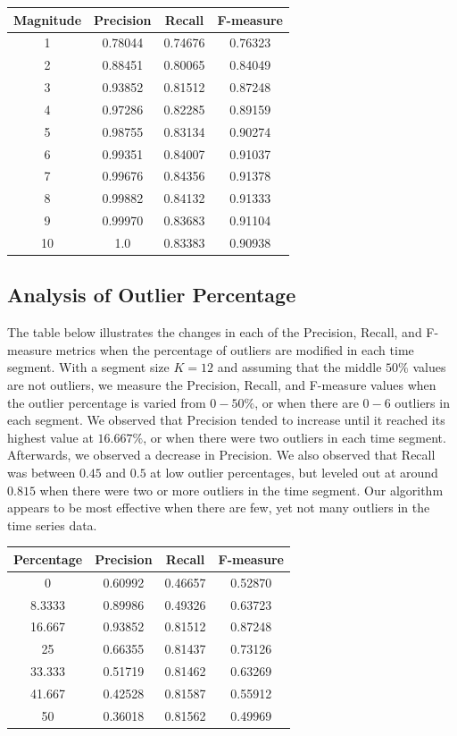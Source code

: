 \documentclass[conference]{IEEEtran}
\begin{document}
\begin{center}
	\begin{tabular}{|c|c|c|c|}
		\hline
		Magnitude & Precision & Recall & F-measure \\
		\hline
		1 & 0.78044 & 0.74676 & 0.76323 \\
		\hline
		2 & 0.88451 & 0.80065 & 0.84049 \\
		\hline
		3 & 0.93852 & 0.81512 & 0.87248 \\
		\hline
		4 & 0.97286 & 0.82285 & 0.89159 \\
		\hline
		5 & 0.98755 & 0.83134 & 0.90274 \\
		\hline
		6 & 0.99351 & 0.84007 & 0.91037 \\
		\hline
		7 & 0.99676 & 0.84356 & 0.91378 \\
		\hline
		8 & 0.99882 & 0.84132 & 0.91333 \\
		\hline
		9 & 0.99970 & 0.83683 & 0.91104 \\
		\hline
		10 & 1.0 & 0.83383 & 0.90938 \\
		\hline
	\end{tabular}
\end{center}

\subsection{Analysis of Outlier Percentage}
The table below illustrates the changes in each of the Precision, Recall, and F-measure metrics when the percentage of outliers are modified in each time segment. With a segment size $K = 12$ and assuming that the middle $50\%$ values are not outliers, we measure the Precision, Recall, and F-measure values when the outlier percentage is varied from $0-50\%$, or when there are $0-6$ outliers in each segment. We observed that Precision tended to increase until it reached its highest value at $16.667\%$, or when there were two outliers in each time segment. Afterwards, we observed a decrease in Precision. We also observed that Recall was between $0.45$ and $0.5$ at low outlier percentages, but leveled out at around $0.815$ when there were two or more outliers in the time segment. Our algorithm appears to be most effective when there are few, yet not many outliers in the time series data.

\begin{center}
	\begin{tabular}{|c|c|c|c|}
		\hline
		Percentage & Precision & Recall & F-measure \\
		\hline
		0 & 0.60992 & 0.46657 & 0.52870 \\
		\hline
		8.3333 & 0.89986 & 0.49326 & 0.63723 \\
		\hline
		16.667 & 0.93852 & 0.81512 & 0.87248 \\
		\hline
		25 & 0.66355 & 0.81437 & 0.73126 \\
		\hline
		33.333 & 0.51719 & 0.81462 & 0.63269 \\
		\hline
		41.667 & 0.42528 & 0.81587 & 0.55912 \\
		\hline
		50 & 0.36018 & 0.81562 & 0.49969 \\
		\hline
	\end{tabular}
\end{center}
\end{document}
